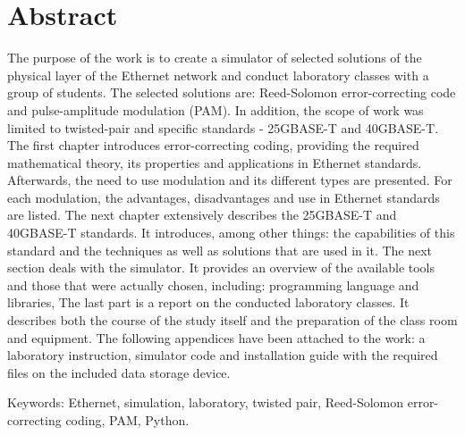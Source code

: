 \section*{Abstract}

The purpose of the work is to create a simulator of selected solutions of the physical layer of the Ethernet network and conduct laboratory classes with a group of students. The selected solutions are: Reed-Solomon error-correcting code and pulse-amplitude modulation (PAM). In addition, the scope of work was limited to twisted-pair and specific standards - 25GBASE-T and 40GBASE-T. The first chapter introduces error-correcting coding, providing the required mathematical theory, its properties and applications in Ethernet standards. Afterwards, the need to use modulation and its different types are presented. For each modulation, the advantages, disadvantages and use in Ethernet standards are listed. The next chapter extensively describes the 25GBASE-T and 40GBASE-T standards. It introduces, among other things: the capabilities of this standard and the techniques as well as solutions that are used in it. The next section deals with the simulator. It provides an overview of the available tools and those that were actually chosen, including: programming language and libraries, The last part is a report on the conducted laboratory classes. It describes both the course of the study itself and the preparation of the class room and equipment. The following appendices have been attached to the work: a laboratory instruction, simulator code and installation guide with the required files on the included data storage device.

Keywords: Ethernet, simulation, laboratory, twisted pair, Reed-Solomon error-correcting coding, PAM, Python.